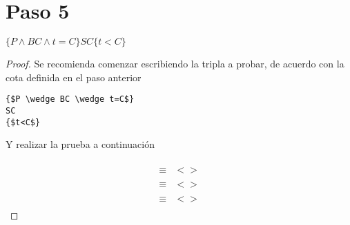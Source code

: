 \documentclass[]{article}
\begin{document}
\section*{Paso 5}
$\{P \wedge BC \wedge t=C\}SC\{t<C\}$
\begin{proof}

Se recomienda comenzar escribiendo la tripla a probar, de acuerdo con la cota definida en el paso anterior

\begin{lstlisting}[language=GCL, mathescape, tabsize=4]
{$P \wedge BC \wedge t=C$}
SC
{$t<C$}
\end{lstlisting}

Y realizar la prueba a continuación

\begin{align*}
& \\
\equiv &<\text{}> \\
& \\
\equiv &<\text{}> \\
& \\
\equiv &<\text{}> \\
& 
\end{align*}

\end{proof}
	
\end{document}
